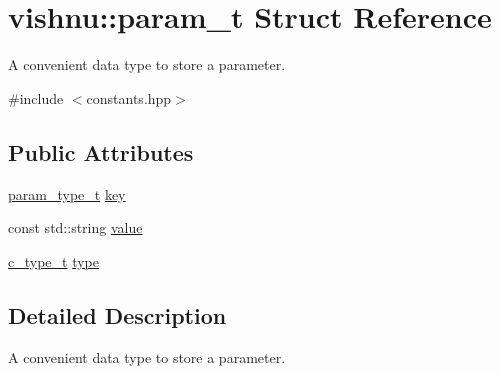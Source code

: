 \hypertarget{structvishnu_1_1param__t}{
\section{vishnu::param\_\-t Struct Reference}
\label{structvishnu_1_1param__t}
}


A convenient data type to store a parameter.  




{\ttfamily \#include $<$constants.hpp$>$}

\subsection*{Public Attributes}
\begin{DoxyCompactItemize}
\item 
\hyperlink{namespacevishnu_afa06c1bb0b3442d83acb7650e8df75d1}{param\_\-type\_\-t} \hyperlink{structvishnu_1_1param__t_aa5ddc5895c65c3e15565c237767fe854}{key}
\item 
const std::string \hyperlink{structvishnu_1_1param__t_a0e0ab5147d45a0534874278b4b0d0b61}{value}
\item 
\hyperlink{namespacevishnu_ad8abe82f8ea57792411b26b9ed15287e}{c\_\-type\_\-t} \hyperlink{structvishnu_1_1param__t_aea92abf3252828b48153b811a9396b2b}{type}
\end{DoxyCompactItemize}


\subsection{Detailed Description}
A convenient data type to store a parameter. 

